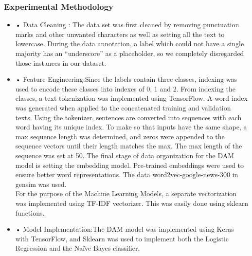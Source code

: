 \documentclass[runningheads]{llncs}
\begin{document}
\subsubsection{Experimental Methodology}
\begin{itemize}
\item •	Data Cleaning {:} The data set was first cleaned by removing punctuation marks and other unwanted characters as well as setting all the text to lowercase. During the data annotation, a label which could not have a single majority has an {“underscore”} as a placeholder, so we completely disregarded those instances in our dataset. 

\item •	Feature Engineering{:}Since the labels contain three classes, indexing was used to encode these classes into indexes of 0, 1 and 2.  From indexing the classes, a text tokenization was implemented using TensorFlow. A word index was generated when applied to the concatenated training and validation texts. Using the tokenizer, sentences are converted into sequences with each word having its unique index. To make so that inputs have the same shape, a max sequence length was determined, and zeros were appended to the sequence vectors until their length matches the max. The max length of the sequence was set at 50. The final stage of data organization for the DAM model is setting the embedding model. Pre-trained embeddings were used to ensure better word representations. The data  word2vec-google-news-300 in gensim was used.
\\
For the purpose of the Machine Learning Models, a separate vectorization was implemented using TF-IDF vectorizer. This was easily done using sklearn functions.
\item •	Model Implementation{:}The DAM model was implemented using Keras with TensorFlow, and Sklearn was used to implement both the Logistic Regression and the Naïve Bayes classifier.\\

\end{itemize}
\end{document}
